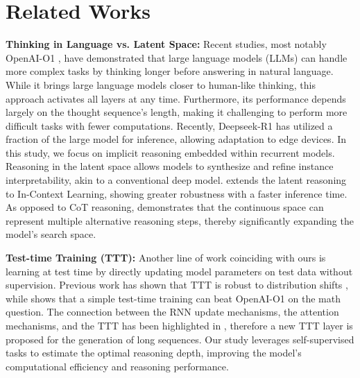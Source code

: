 \section{Related Works}
\label{sec:relatedwork}

\textbf{Thinking in Language vs. Latent Space:} 
Recent studies, most notably OpenAI-O1 \cite{jaech2024openai}, have demonstrated that large language models (LLMs) can handle more complex tasks by thinking longer before answering in natural language.  
While it brings large language models closer to human-like thinking, this approach activates all layers at any time. 
Furthermore, its performance depends largely on the thought sequence's length, making it challenging to perform more difficult tasks with fewer computations.
Recently, Deepseek-R1 \cite{guo2025deepseek} has utilized a fraction of the large model for inference, allowing adaptation to edge devices. 
In this study, we focus on implicit reasoning embedded within recurrent models. 
Reasoning in the latent space allows models to synthesize and refine instance interpretability, akin to a conventional deep model.
\citet{xu2024lars} extends the latent reasoning to In-Context Learning, showing greater robustness with a faster inference time. 
As opposed to CoT reasoning, \citet{hao2024training} demonstrates that the continuous space can represent multiple alternative reasoning steps, thereby significantly expanding the model's search space.


\textbf{Test-time Training (TTT):} 
Another line of work coinciding with ours is learning at test time by directly updating model parameters on test data without supervision. 
Previous work has shown that TTT is robust to distribution shifts \citep{sun2020test,gandelsman2022test}, while \citet{muennighoff2025s1simpletesttimescaling} shows that a simple test-time training can beat OpenAI-O1 on the math question.
The connection between the RNN update mechanisms, the attention mechanisms, and the TTT has been highlighted in \citet{sun2024learning}, therefore a new TTT layer is proposed for the generation of long sequences. 
Our study leverages self-supervised tasks to estimate the optimal reasoning depth, improving the model's computational efficiency and reasoning performance.

